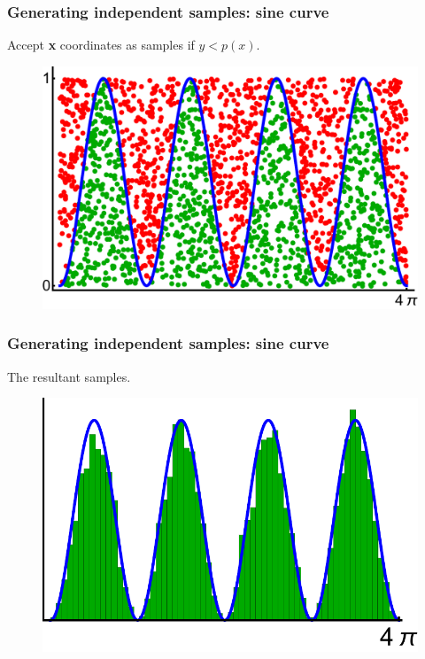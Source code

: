 \documentclass[handout]{beamer}
\begin{document}
\begin{frame}
\frametitle{Generating independent samples: sine curve}
Accept \textbf{x} coordinates as samples if $y<p(x)$.

\begin{figure}[ht]
\centerline{\includegraphics[width=1\textwidth]{animations_figures/lec4_rejection4.pdf}}
\end{figure}

\end{frame}

\begin{frame}
\frametitle{Generating independent samples: sine curve}
The resultant samples.

\begin{figure}[ht]
\centerline{\includegraphics[width=1\textwidth]{animations_figures/lec4_rejection5.pdf}}
\end{figure}

\end{frame}
\end{document}
